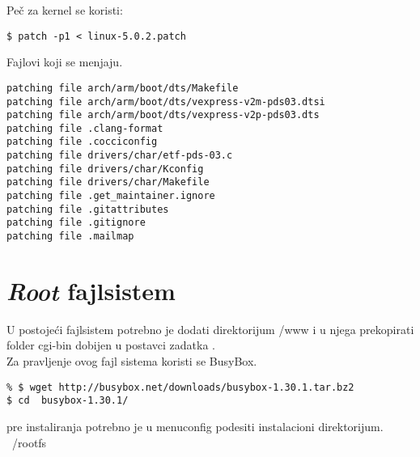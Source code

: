 \documentclass{article}
\begin{document}

Peč za kernel se koristi:

\begin{commandline}
  \begin{verbatim}
$ patch -p1 < linux-5.0.2.patch
  \end{verbatim}
\end{commandline}

Fajlovi koji se menjaju.
\begin{commandline}
  \begin{verbatim}
patching file arch/arm/boot/dts/Makefile
patching file arch/arm/boot/dts/vexpress-v2m-pds03.dtsi
patching file arch/arm/boot/dts/vexpress-v2p-pds03.dts
patching file .clang-format
patching file .cocciconfig
patching file drivers/char/etf-pds-03.c
patching file drivers/char/Kconfig
patching file drivers/char/Makefile
patching file .get_maintainer.ignore
patching file .gitattributes
patching file .gitignore
patching file .mailmap
  \end{verbatim}
\end{commandline}

\section{\textit{Root} fajlsistem}


U postojeći fajlsistem potrebno je dodati direktorijum /www i u njega prekopirati folder cgi-bin dobijen u postavci zadatka . \\

Za pravljenje ovog fajl sistema koristi se BusyBox. \\


\begin{commandline}
  \begin{verbatim}
% $ wget http://busybox.net/downloads/busybox-1.30.1.tar.bz2
$ cd  busybox-1.30.1/
  \end{verbatim}
\end{commandline}


pre instaliranja potrebno je u menuconfig podesiti instalacioni direktorijum. ~/rootfs \\
\end{document}
